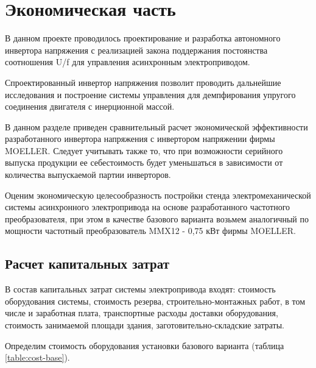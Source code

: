 \section{Экономическая часть}
        В данном проекте проводилось проектирование и разработка автономного
        инвертора напряжения с реализацией закона поддержания постоянства
        соотношения U/f для управления асинхронным электроприводом.

        Спроектированный инвертор напряжения позволит проводить дальнейшие
        исследования и построение системы управления для демпфирования упругого
        соединения двигателя с инерционной массой. 

        В данном разделе приведен сравнительный расчет экономической
        эффективности разработанного инвертора напряжения с инвертором
        напряжении фирмы MOELLER. Следует учитывать также то, что при
        возможности серийного выпуска продукции ее себестоимость будет
        уменьшаться в зависимости от количества выпускаемой партии инверторов.

        Оценим экономическую целесообразность постройки стенда
        электромеханической системы асинхронного электропривода на основе
        разработанного частотного преобразователя, при этом в качестве базового
        варианта возьмем аналогичный по мощности частотный преобразователь
        MMX12 - 0,75 кВт фирмы MOELLER.

    \subsection{Расчет капитальных затрат}
        В состав капитальных затрат системы электропривода входят: стоимость
        оборудования системы, стоимость резерва, строительно-монтажных работ, в
        том числе и заработная плата, транспортные расходы доставки
        оборудования, стоимость занимаемой площади здания,
        заготовительно-складские затраты.

        Определим стоимость оборудования установки базового варианта (таблица
        \ref{table:cost-base}).

